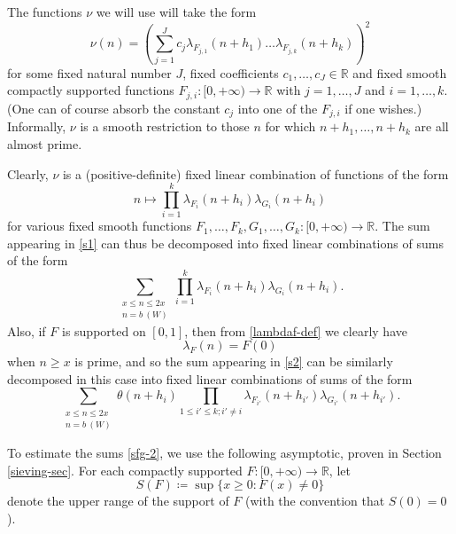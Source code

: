\documentclass{bmcart}
\theoremstyle{plain}
\theoremstyle{definition}
\newcommand\R{\mathbb{R}}
\begin{document}
The functions $\nu$ we will use will take the form
\begin{equation}\label{nuform}
 \nu(n) = \left( \sum_{j=1}^J c_j \lambda_{F_{j,1}}(n+h_1) \dots \lambda_{F_{j,k}}(n+h_k) \right)^2 
\end{equation}
for some fixed natural number $J$, fixed coefficients $c_1,\dots,c_J \in \R$ and fixed smooth compactly supported functions $F_{j,i}: [0,+\infty) \to \R$ with $j=1,\dots,J$ and $i=1,\dots,k$.  (One can of course absorb the constant $c_j$ into one of the $F_{j,i}$ if one wishes.)   Informally, $\nu$ is a smooth restriction to those $n$ for which $n+h_1,\dots,n+h_k$ are all almost prime.

Clearly, $\nu$ is a (positive-definite) fixed linear combination of functions of the form
$$ n \mapsto \prod_{i=1}^k \lambda_{F_i}(n+h_i) \lambda_{G_i}(n+h_i)$$
for various fixed smooth functions $F_1,\dots,F_k,G_1,\dots,G_k: [0,+\infty) \to \R$.  The sum appearing in \eqref{s1} can thus be decomposed into fixed linear combinations of sums of the form
\begin{equation}\label{sfg-1}
 \sum_{\substack{x \leq n \leq 2x\\ n = b\ (W)}} \prod_{i=1}^k \lambda_{F_i}(n+h_i) \lambda_{G_i}(n+h_i).
\end{equation}
Also, if $F$ is supported on $[0,1]$, then from \eqref{lambdaf-def} we clearly have
\begin{equation}\label{lambdan-prime}
\lambda_F(n) = F(0)
\end{equation}
when $n \geq x$ is prime, and so the sum appearing in \eqref{s2} can be similarly decomposed in this case into fixed linear combinations of sums of the form
\begin{equation}\label{sfg-2}
 \sum_{\substack{x \leq n \leq 2x\\ n = b\ (W)}} \theta(n+h_i) \prod_{1 \leq i' \leq k; i' \neq i} \lambda_{F_{i'}}(n+h_{i'}) \lambda_{G_{i'}}(n+h_{i'}).
\end{equation}

To estimate the sums \eqref{sfg-2}, we use the following asymptotic, proven in Section \ref{sieving-sec}.  For each compactly supported $F: [0,+\infty) \to \R$, let
\begin{equation}\label{S-def}
S(F) \coloneqq \sup \{ x \geq 0: F(x) \neq 0\}
\end{equation}
 denote the upper range of the support of $F$ (with the convention that $S(0)=0$).
\end{document}
